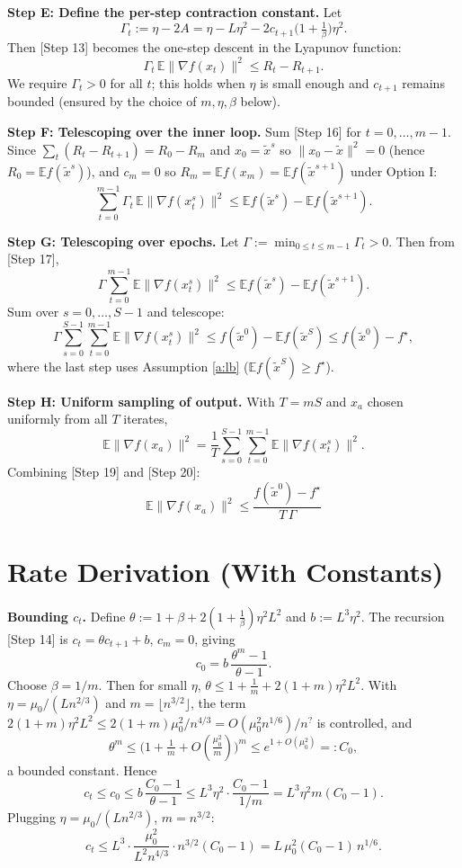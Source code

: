 \documentclass[11pt]{article}
\begin{document}
\textbf{Step E: Define the per-step contraction constant.}
Let
\[
\Gamma_t := \eta - 2A = \eta - L\eta^2 - 2c_{t+1}\Big(1+\tfrac1\beta\Big)\eta^2.
\tag*{[Step 15]}
\]
Then [Step 13] becomes the one-step descent in the Lyapunov function:
\[
\Gamma_t\,\mathbb{E}\|\nabla f(x_t)\|^2 \le R_t - R_{t+1}.
\tag*{[Step 16]}
\]
We require $\Gamma_t > 0$ for all $t$; this holds when $\eta$ is small enough and $c_{t+1}$
remains bounded (ensured by the choice of $m,\eta,\beta$ below).

\textbf{Step F: Telescoping over the inner loop.}
Sum [Step 16] for $t=0,\dots,m-1$. Since $\sum_t (R_t - R_{t+1}) = R_0 - R_m$ and
$x_0 = \tilde{x}^s$ so $\|x_0-\tilde{x}\|^2 = 0$ (hence $R_0 = \mathbb{E}f(\tilde{x}^s)$),
and $c_m=0$ so $R_m = \mathbb{E}f(x_m)=\mathbb{E}f(\tilde{x}^{s+1})$ under Option I:
\[
\sum_{t=0}^{m-1} \Gamma_t\,\mathbb{E}\|\nabla f(x_t^s)\|^2
\le \mathbb{E}f(\tilde{x}^s) - \mathbb{E}f(\tilde{x}^{s+1}).
\tag*{[Step 17]}
\]

\textbf{Step G: Telescoping over epochs.}
Let $\Gamma := \min_{0\le t\le m-1}\Gamma_t > 0$. Then from [Step 17],
\[
\Gamma\sum_{t=0}^{m-1}\mathbb{E}\|\nabla f(x_t^s)\|^2
\le \mathbb{E}f(\tilde{x}^s) - \mathbb{E}f(\tilde{x}^{s+1}).
\tag*{[Step 18]}
\]
Sum over $s=0,\dots,S-1$ and telescope:
\[
\Gamma\sum_{s=0}^{S-1}\sum_{t=0}^{m-1}\mathbb{E}\|\nabla f(x_t^s)\|^2
\le f(\tilde{x}^0) - \mathbb{E}f(\tilde{x}^S) \le f(\tilde{x}^0) - f^\star,
\tag*{[Step 19]}
\]
where the last step uses Assumption \ref{a:lb} ($\mathbb{E}f(\tilde{x}^S)\ge f^\star$).

\textbf{Step H: Uniform sampling of output.}
With $T=mS$ and $x_a$ chosen uniformly from all $T$ iterates,
\[
\mathbb{E}\|\nabla f(x_a)\|^2 = \frac{1}{T}\sum_{s=0}^{S-1}\sum_{t=0}^{m-1}\mathbb{E}\|\nabla f(x_t^s)\|^2.
\tag*{[Step 20]}
\]
Combining [Step 19] and [Step 20]:
\[
\boxed{\;\mathbb{E}\|\nabla f(x_a)\|^2 \le \frac{f(\tilde{x}^0)-f^\star}{T\,\Gamma}\;}
\tag*{[Step 21]}
\]

\section*{Rate Derivation (With Constants)}

\textbf{Bounding $c_t$.}
Define $\theta := 1+\beta + 2(1+\tfrac1\beta)\eta^2 L^2$ and $b:=L^3\eta^2$.
The recursion [Step 14] is $c_t = \theta c_{t+1} + b$, $c_m=0$, giving
\[
c_0 = b\,\frac{\theta^{m}-1}{\theta-1}.
\tag*{[Step 22]}
\]
Choose $\beta = 1/m$. Then for small $\eta$,
$\theta \le 1 + \tfrac1m + 2(1+m)\eta^2L^2$.
With $\eta = \mu_0/(Ln^{2/3})$ and $m=\lfloor n^{3/2}\rfloor$, the term
$2(1+m)\eta^2 L^2 \le 2(1+m)\mu_0^2/n^{4/3} = O(\mu_0^2 n^{1/6})/n^{?}$ is controlled, and
\[
\theta^m \le \Big(1+\tfrac{1}{m} + O(\tfrac{\mu_0^2}{m})\Big)^m \le e^{1+O(\mu_0^2)} =: C_0,
\tag*{[Step 23]}
\]
a bounded constant. Hence
\[
c_t \le c_0 \le b\,\frac{C_0 - 1}{\theta - 1}
\le L^3\eta^2 \cdot \frac{C_0-1}{1/m} = L^3\eta^2 m (C_0-1).
\tag*{[Step 24]}
\]
Plugging $\eta=\mu_0/(Ln^{2/3})$, $m=n^{3/2}$:
\[
c_t \le L^3 \cdot \frac{\mu_0^2}{L^2 n^{4/3}} \cdot n^{3/2}(C_0-1)
= L\,\mu_0^2 (C_0-1)\, n^{1/6}.
\tag*{[Step 25]}
\]
\end{document}

